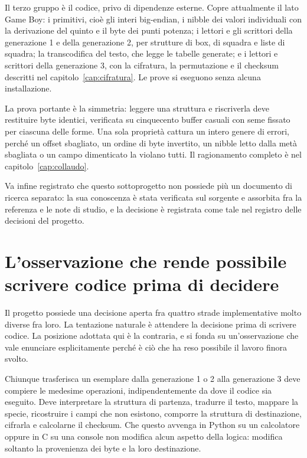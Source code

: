 Il terzo gruppo è il codice, privo di dipendenze esterne. Copre attualmente il lato Game Boy: i primitivi, cioè gli interi big-endian, i nibble dei valori individuali con la derivazione del quinto e il byte dei punti potenza; i lettori e gli scrittori della generazione 1 e della generazione 2, per strutture di box, di squadra e liste di squadra; la transcodifica del testo, che legge le tabelle generate; e i lettori e scrittori della generazione 3, con la cifratura, la permutazione e il checksum descritti nel capitolo~\ref{cap:cifratura}. Le prove si eseguono senza alcuna installazione.

La prova portante è la simmetria: leggere una struttura e riscriverla deve restituire byte identici, verificata su cinquecento buffer casuali con seme fissato per ciascuna delle forme. Una sola proprietà cattura un intero genere di errori, perché un offset sbagliato, un ordine di byte invertito, un nibble letto dalla metà sbagliata o un campo dimenticato la violano tutti. Il ragionamento completo è nel capitolo~\ref{cap:collaudo}.

Va infine registrato che questo sottoprogetto non possiede più un documento di ricerca separato: la sua conoscenza è stata verificata sul sorgente e assorbita fra la referenza e le note di studio, e la decisione è registrata come tale nel registro delle decisioni del progetto.

\section{L'osservazione che rende possibile scrivere codice prima di decidere}

Il progetto possiede una decisione aperta fra quattro strade implementative molto diverse fra loro. La tentazione naturale è attendere la decisione prima di scrivere codice. La posizione adottata qui è la contraria, e si fonda su un'osservazione che vale enunciare esplicitamente perché è ciò che ha reso possibile il lavoro finora svolto.

Chiunque trasferisca un esemplare dalla generazione 1 o 2 alla generazione 3 deve compiere le medesime operazioni, indipendentemente da dove il codice sia eseguito. Deve interpretare la struttura di partenza, tradurre il testo, mappare la specie, ricostruire i campi che non esistono, comporre la struttura di destinazione, cifrarla e calcolarne il checksum. Che questo avvenga in Python su un calcolatore oppure in C su una console non modifica alcun aspetto della logica: modifica soltanto la provenienza dei byte e la loro destinazione.

